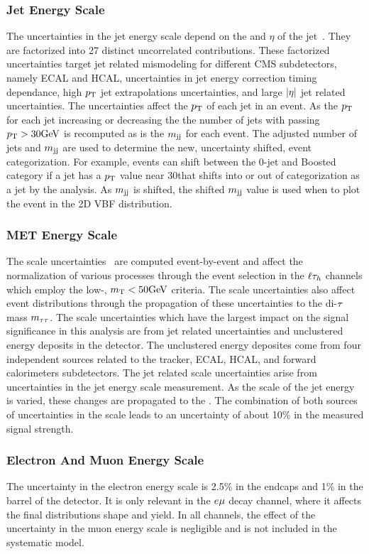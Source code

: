 \subsubsection{Jet Energy Scale}
The uncertainties in the jet energy scale depend on the \pt and $\eta$ of the jet~\cite{CMS-JME-10-011}.
They are factorized into 27 distinct uncorrelated contributions. These factorized uncertainties target jet related 
mismodeling for different CMS subdetectors, namely ECAL and HCAL, uncertainties in jet energy correction timing dependance,
high $p_\mathrm{T}$ jet extrapolations uncertainties, and large $\lvert\eta\rvert$ jet related uncertainties. The uncertainties
affect the $p_\mathrm{T}$ of each jet in an event. As the $p_\mathrm{T}$ for each jet increasing or decreasing the 
the number of jets with passing $p_\mathrm{T} > 30\mathrm{GeV}$ is recomputed as is the $m_\mathrm{jj}$ for each event. The adjusted number of
jets and $m_\mathrm{jj}$ are used to determine the new, uncertainty shifted, event categorization. For example,
events can shift between the 0-jet and Boosted category if a jet has a $p_\mathrm{T}$ value near 30\GeV that shifts into
or out of categorization as a jet by the analysis. As $m_\mathrm{jj}$ is shifted, the shifted $m_\mathrm{jj}$ value is used when
to plot the event in the 2D VBF distribution.


\subsubsection{MET Energy Scale}
The \etvecmiss scale uncertainties~\cite{CMS-JME-12-002} are computed event-by-event and affect the normalization of 
various processes through the event selection in the $\ell\tau_{h}$ channels which employ the low-\MT,
$m_\mathrm{T} < 50\mathrm{GeV}$ criteria. The \etvecmiss scale uncertainties also affect event distributions through the 
propagation of these uncertainties 
to the di-$\tau$ mass $m_{\tau\tau}$. The \etvecmiss scale uncertainties which have the largest impact on the signal significance
in this analysis are from jet related uncertainties and unclustered energy deposits in the detector.
The unclustered energy deposites come from four independent sources related to the tracker, ECAL, HCAL, and 
forward calorimeters subdetectors. The jet related \etvecmiss scale uncertainties arise from uncertainties
in the jet energy scale measurement. As the scale of the jet energy is varied, these changes are propagated to
the \etvecmiss. The combination of both sources of uncertainties in 
the \etvecmiss scale leads to an uncertainty of about 10\% in the measured signal strength.


\subsubsection{Electron And Muon Energy Scale}
The uncertainty in the electron energy scale is 2.5\% in the endcaps and 1\% in the barrel of the detector. 
It is only relevant in the $e\mu$ decay channel, where it affects the final distributions shape and yield.
In all channels, the effect of the uncertainty in the muon energy scale is negligible and is not included
in the systematic model.


